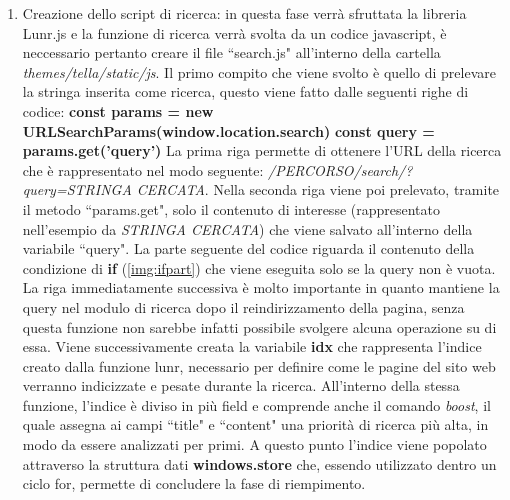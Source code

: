 \documentclass[target=bach,aauheader=]{thud}
\begin{document}
\begin{enumerate}
    \item Creazione dello script di ricerca: in questa fase verrà sfruttata la libreria Lunr.js e la funzione di ricerca verrà svolta da un codice javascript, è neccessario pertanto creare il file ``search.js" all'interno della cartella \textit{themes/tella/static/js}.
    \newline \newline 
    Il primo compito che viene svolto è quello di prelevare la stringa inserita come ricerca, questo viene fatto dalle seguenti righe di codice:
    \newline \newline
    \textbf{const params = new URLSearchParams(window.location.search)}
    \newline
    \textbf{const query = params.get('query')}
    \newline \newline
    La prima riga permette di ottenere l'URL della ricerca che è rappresentato nel modo seguente: \textit{/PERCORSO/search/?query=STRINGA CERCATA}.
    \newline
    Nella seconda riga viene poi prelevato, tramite il metodo ``params.get", solo il contenuto di interesse (rappresentato nell'esempio da \textit{STRINGA CERCATA}) che viene salvato all'interno della variabile ``query".
    \newline \newline
    La parte seguente del codice riguarda il contenuto della condizione di \textbf{if} (\cref{img:ifpart}) che viene eseguita solo se la query non è vuota. La riga immediatamente successiva è molto importante in quanto mantiene la query nel modulo di ricerca dopo il reindirizzamento della pagina, senza questa funzione non sarebbe infatti possibile svolgere alcuna operazione su di essa.
    \newline
    Viene successivamente creata la variabile \textbf{idx} che rappresenta l'indice creato dalla funzione lunr, necessario per definire come le pagine del sito web verranno indicizzate e pesate durante la ricerca.
    \newline
    All'interno della stessa funzione, l'indice è diviso in più field e comprende anche il comando \textit{boost}, il quale assegna ai campi ``title" e ``content" una priorità di ricerca più alta, in modo da essere analizzati per primi.  
    \newline
    A questo punto l'indice viene popolato attraverso la struttura dati \textbf{windows.store} che, essendo utilizzato dentro un ciclo for, permette di concludere la fase di riempimento.

\end{enumerate}
\end{document}
